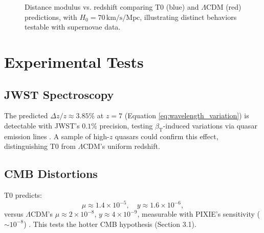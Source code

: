 \documentclass[12pt,a4paper]{article}
\newcommand{\betaT}{\beta_{\text{T}}}
\begin{document}
	\begin{figure}[ht]
		\centering
		\caption{Distance modulus vs. redshift comparing T0 (blue) and \(\Lambda\)CDM (red) predictions, with \(H_0 = 70 \, \text{km/s/Mpc}\), illustrating distinct behaviors testable with supernovae data.}
		\label{fig:distance_modulus}
	\end{figure}
	
	\section{Experimental Tests}
	\label{sec:tests}
	
	\subsection{JWST Spectroscopy}
	\label{subsec:jwst_test}
	
	The predicted \(\Delta z / z \approx 3.85\%\) at \(z = 7\) (Equation \ref{eq:wavelength_variation}) is detectable with JWST’s \(0.1\%\) precision, testing \(\betaT\)-induced variations via quasar emission lines \cite{pascher_params_2025}. A sample of high-\(z\) quasars could confirm this effect, distinguishing T0 from \(\Lambda\)CDM’s uniform redshift.
	
	\subsection{CMB Distortions}
	\label{subsec:cmb_distortions_test}
	
	T0 predicts:
	\begin{equation}
		\mu \approx 1.4 \times 10^{-5}, \quad y \approx 1.6 \times 10^{-6},
		\label{eq:distortion_parameters}
	\end{equation}
	versus \(\Lambda\)CDM’s \(\mu \approx 2 \times 10^{-8}\), \(y \approx 4 \times 10^{-9}\), measurable with PIXIE’s sensitivity (\(\sim 10^{-8}\)) \cite{pascher_temp_2025}. This tests the hotter CMB hypothesis (Section 3.1).
	
\end{document}
